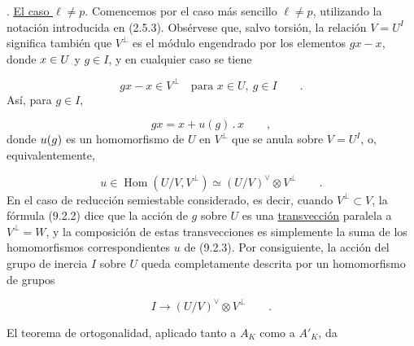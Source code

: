 
\medskip
{}. \underline{El caso $\ell\neq p$}. Comencemos por el caso más
sencillo $\ell\neq p$, utilizando la notación introducida en (2.5.3).
Obsérvese que, salvo torsión, la relación $V=U^I$ significa también que
$V^{\perp}$ es el módulo engendrado por los elementos $gx-x$, donde
$\sisi{u\in U}{x\in U}$ y $g\in I$, y en cualquier caso se tiene

\begin{equation}\tag{9.2.1}
gx-x\in V^{\perp}\quad\text{para }x\in U,\ g\in I \qquad .
\end{equation}
Así, para $g\in I$,

\begin{equation}\tag{9.2.2}
gx=x+u(g)\mathbin{.}x \qquad ,
\end{equation}
donde $\sisi{g\longmapsto u(g)}{u(g)}$ es un homomorfismo de $U$ en
$V^{\perp}$ que se anula sobre $V=U^I$, o, equivalentemente,

\begin{equation}\tag{9.2.3}
u\in\operatorname{Hom}(U/V,V^{\perp})
 \simeq (U/V)^{\vee}\otimes V^{\perp} \qquad .
\end{equation}
En el caso de reducción semiestable considerado, es decir, cuando
$V^{\perp}\subset V$, la fórmula (9.2.2) dice que la acción de $g$ sobre
$U$ es una \underline{transvección} paralela a $V^{\perp}=W$, y la
composición de estas transvecciones es simplemente la suma de los
homomorfismos correspondientes $u$ de (9.2.3). Por consiguiente, la
acción del grupo de inercia $I$ sobre $U$ queda completamente descrita
por un homomorfismo de grupos

\begin{equation}\tag{9.2.4}
I\longrightarrow (U/V)^{\vee}\otimes V^{\perp} \qquad .
\end{equation}


El teorema de ortogonalidad, aplicado tanto a $A_K$ como a $A'_K$, da

